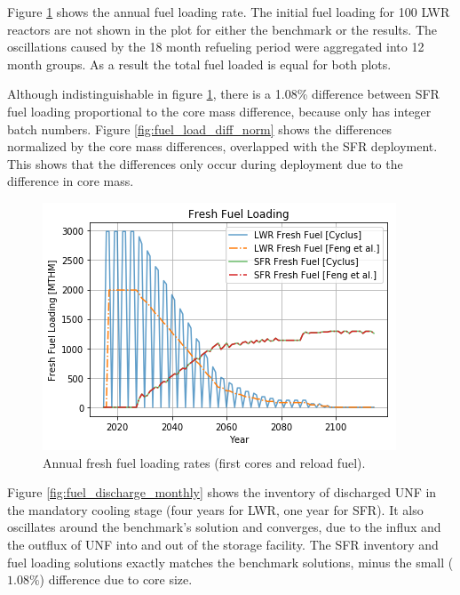 Figure \ref{fig:fuel_load} shows the annual fuel loading rate.
The initial fuel loading for 100 \gls{LWR} reactors are not shown in
the plot for either the benchmark or the \Cyclus results.
The oscillations caused by the 18 month refueling period
were aggregated into 12 month groups. As a result the total fuel loaded
is equal for both plots.

Although indistinguishable in figure \ref{fig:fuel_load},
there is a 1.08\% difference between \gls{SFR} fuel loading proportional
to the core mass difference, because \Cyclus only has integer batch numbers.
Figure \ref{fig:fuel_load_diff_norm} shows the
differences normalized by the core mass differences, overlapped with the
\gls{SFR} deployment. This shows that the differences only occur during
deployment due to the difference in core mass.


\begin{figure}[htbp!]
	\begin{center}
		\includegraphics[scale=0.7]{./images/results_18/fuel_load.png}
	\end{center}
	\caption{Annual fresh fuel loading rates (first cores and reload fuel).}
	\label{fig:fuel_load}
\end{figure}

Figure \ref{fig:fuel_discharge_monthly} shows the inventory of discharged
\gls{UNF} in the mandatory cooling stage (four years for \gls{LWR}, one year for \gls{SFR}).
It also oscillates around the benchmark's
solution and converges, due to the influx and the outflux of \gls{UNF}
into and out of the storage facility.
The \gls{SFR} inventory and fuel loading
solutions exactly matches the benchmark solutions, minus the small ($1.08\%$) difference due to core
size.


